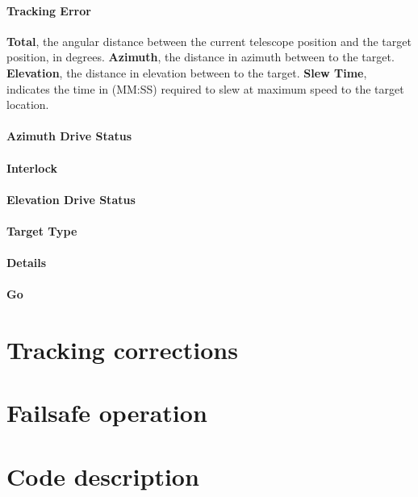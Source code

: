 \documentclass[letterpaper,12pt]{report}
\begin{document}
\subsubsection{Tracking Error}

\textbf{Total}, the angular distance between the current telescope position
and the target position, in degrees. \textbf{Azimuth}, the distance in
azimuth between to the target. \textbf{Elevation}, the distance in
elevation between to the target. \textbf{Slew Time}, indicates the time 
in (MM:SS) required to slew at maximum speed to the target location.

\subsubsection{Azimuth Drive Status}


\subsubsection{Interlock}

\subsubsection{Elevation Drive Status}

\subsubsection{Target Type}

\subsubsection{Details}

\subsubsection{Go}


\chapter{Tracking corrections}
\label{CHAP::CORRECTIONS}
\thispagestyle{fancy}

\chapter{Failsafe operation}
\label{CHAP::FAILSAFE}
\thispagestyle{fancy}

\chapter{Code description}
\label{CHAP::CODE}
\thispagestyle{fancy}
\end{document}
